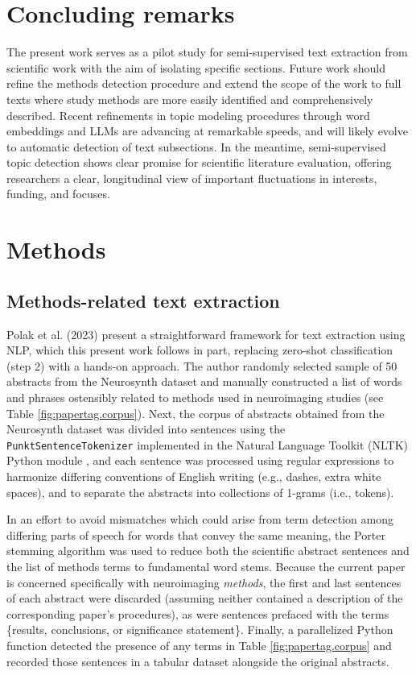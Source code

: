 \section{Concluding remarks}
\label{sec:papertag.concludingremarks}

The present work serves as a pilot study for semi-supervised text extraction from scientific work with the aim of isolating specific sections. Future work should refine the methods detection procedure and extend the scope of the work to full texts where study methods are more easily identified and comprehensively described. Recent refinements in topic modeling procedures through word embeddings and LLMs are advancing at remarkable speeds, and will likely evolve to automatic detection of text subsections. In the meantime, semi-supervised topic detection shows clear promise for scientific literature evaluation, offering researchers a clear, longitudinal view of important fluctuations in interests, funding, and focuses.

\section{Methods}
\label{sec:papertag.methods}

\subsection{Methods-related text extraction}

Polak et al. (2023) \cite{PolakEtAl2023} present a straightforward framework for text extraction using NLP, which this present work follows in part, replacing zero-shot classification (step 2) with a hands-on approach. The author randomly selected sample of 50 abstracts from the Neurosynth dataset and manually constructed a list of words and phrases ostensibly related to methods used in neuroimaging studies (see Table \ref{fig:papertag.corpus}). Next, the corpus of abstracts obtained from the Neurosynth dataset was divided into sentences using the \texttt{PunktSentenceTokenizer} \cite{KissStrunk2006} implemented in the Natural Language Toolkit (NLTK) Python module \cite{BirdEtAl2009}, and each sentence was processed using regular expressions to harmonize differing conventions of English writing (e.g., dashes, extra white spaces), and to separate the abstracts into collections of 1-grams (i.e., tokens). 


In an effort to avoid mismatches which could arise from term detection among differing parts of speech for words that convey the same meaning, the Porter stemming algorithm \cite{M.F.Porter1980} was used to reduce both the scientific abstract sentences and the list of methods terms to fundamental word stems. Because the current paper is concerned specifically with neuroimaging \emph{methods}, the first and last sentences of each abstract were discarded (assuming neither contained a description of the corresponding paper's procedures), as were sentences prefaced with the terms \{results, conclusions, or significance statement\}. Finally, a parallelized Python function detected the presence of any terms in Table \ref{fig:papertag.corpus} and recorded those sentences in a tabular dataset alongside the original abstracts. 


